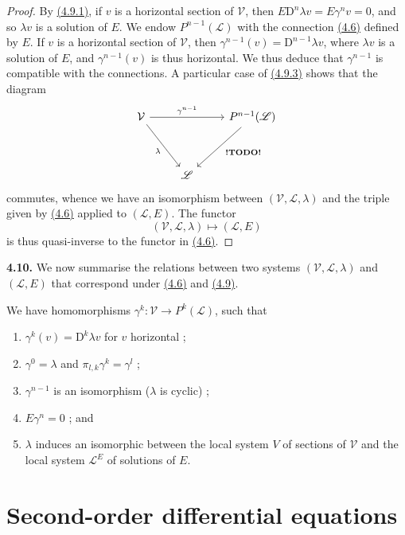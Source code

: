 \documentclass{report}
\newenvironment{rmenv}[1]
  {\phantomsection\par\medskip\noindent\textbf{#1.}\rmfamily}
  {\medskip}
\newcommand{\scr}[1]{{\mathscr{#1}}}
\renewcommand{\cal}[1]{{\mathcal{#1}}}
\newcommand{\DD}{\mathrm{D}}
\newcommand{\todo}{\textbf{ !TODO! }}
\newcommand{\oldpage}[1]{\marginpar{\footnotesize$\Big\vert$ \textit{p.~#1}}}
\begin{document}
\begin{proof}
  By \hyperref[I.4.9.1]{(4.9.1)}, if $v$ is a horizontal section of $\cal{V}$, then $E\DD^n\lambda v = E\gamma^n v = 0$, and so $\lambda v$ is a solution of $E$.
  We endow $P^{n-1}(\scr{L})$ with the connection \hyperref[I.4.6]{(4.6)} defined by $E$.
  If $v$ is a horizontal section of $\cal{V}$, then $\gamma^{n-1}(v)=\DD^{n-1}\lambda v$, where $\lambda v$ is a solution of $E$, and $\gamma^{n-1}(v)$ is thus horizontal.
  We thus deduce that $\gamma^{n-1}$ is compatible with the connections.
  A particular case of \hyperref[I.4.9.3]{(4.9.3)} shows that the diagram
  \[
    \begin{tikzcd}[row sep=huge]
      \cal{V} \ar[rr,"\gamma^{n-1}"] \drar[swap,"\lambda"]
      && P^{n-1}(\scr{L}) \dlar["\todo"]
    \\&\scr{L}&
    \end{tikzcd}
  \]
  commutes, whence we have an isomorphism between $(\cal{V},\scr{L},\lambda)$ and the triple given by \hyperref[I.4.6]{(4.6)} applied to $(\scr{L},E)$.
  The functor
  \[
    (\cal{V},\scr{L},\lambda) \mapsto (\scr{L},E)
  \]
  is thus quasi-inverse to the functor in \hyperref[I.4.6]{(4.6)}.
\end{proof}

\begin{rmenv}{4.10}
\label{I.4.10}
  We now summarise the relations between two systems $(\cal{V},\scr{L},\lambda)$ and $(\scr{L},E)$ that correspond under \hyperref[I.4.6]{(4.6)} and \hyperref[I.4.9]{(4.9)}.

  We have homomorphisms $\gamma^k\colon\cal{V}\to P^k(\scr{L})$, such that
  \begin{enumerate}
    \item[(4.10.1)]\label{I.4.10.1}
      $\gamma^k(v) = \DD^k\lambda v$ for $v$ horizontal ;
\oldpage{29}
    \item[(4.10.2)]\label{I.4.10.2}
      $\gamma^0=\lambda$ and $\pi_{l,k}\gamma^k=\gamma^l$ ;
    \item[(4.10.3)]\label{I.4.10.3}
      $\gamma^{n-1}$ is an isomorphism ($\lambda$ is cyclic) ;
    \item[(4.10.4)]\label{I.4.10.4}
      $E\gamma^n=0$ ; and
    \item[(4.10.5)]\label{I.4.10.5}
      $\lambda$ induces an isomorphic between the local system $V$ of sections of $\cal{V}$ and the local system $\scr{L}^E$ of solutions of $E$.
  \end{enumerate}
\end{rmenv}


\section{Second-order differential equations}
\label{I.5}
\end{document}
